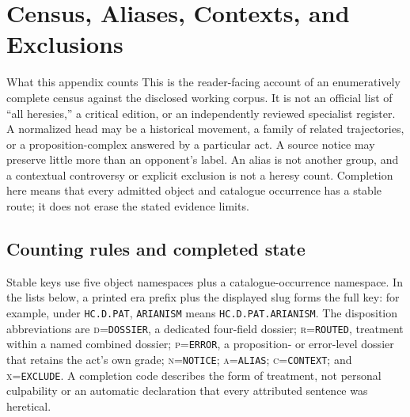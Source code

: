 \section{Census, Aliases, Contexts, and Exclusions}\label{sec:census-accounting}

\begin{studybox}{What this appendix counts}
This is the reader-facing account of an enumeratively complete census against the disclosed working corpus. It is not an official list of ``all heresies,'' a critical edition, or an independently reviewed specialist register. A normalized head may be a historical movement, a family of related trajectories, or a proposition-complex answered by a particular act. A source notice may preserve little more than an opponent's label. An alias is not another group, and a contextual controversy or explicit exclusion is not a heresy count. Completion here means that every admitted object and catalogue occurrence has a stable route; it does not erase the stated evidence limits.
\end{studybox}

\begingroup
\footnotesize
\newcommand{\censuskey}[1]{\nolinkurl{#1}}
\newcommand{\censusitem}[3]{\censuskey{#1}---#2~[\textsc{#3}]}
\newcommand{\aliasitem}[3]{\censuskey{#1}---#2 $\rightarrow$ #3}

\subsection{Counting rules and completed state}\label{app:census-counts}

Stable keys use five object namespaces plus a catalogue-occurrence namespace. In the lists below, a printed era prefix plus the displayed slug forms the full key: for example, under \texttt{HC.D.PAT}, \censuskey{ARIANISM} means \censuskey{HC.D.PAT.ARIANISM}. The disposition abbreviations are \textsc{d}=\texttt{DOSSIER}, a dedicated four-field dossier; \textsc{r}=\texttt{ROUTED}, treatment within a named combined dossier; \textsc{p}=\texttt{ERROR}, a proposition- or error-level dossier that retains the act's own grade; \textsc{n}=\texttt{NOTICE}; \textsc{a}=\texttt{ALIAS}; \textsc{c}=\texttt{CONTEXT}; and \textsc{x}=\texttt{EXCLUDE}. A completion code describes the form of treatment, not personal culpability or an automatic declaration that every attributed sentence was heretical.

